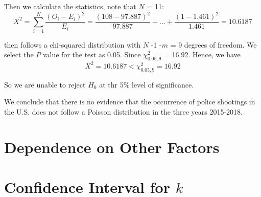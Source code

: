 \documentclass[11pt,a4paper,english]{article}
\begin{document}
Then we calculate the statistics, note that $N$ = 11:
$$
X^{2}=\sum_{i=1}^N{\frac{(O_{i}-E_{i})^{2}}{E_i}}=\frac{(108-97.887)^2}{97.887}+...+\frac{(1-1.461)^2}{1.461}= 10.6187
$$

then follows a chi-squared distribution with $N$ -1 -$m$ = 9 degrees of freedom. We select the $P$ value for the test as 0.05. Since $\chi_{0.05,9}^{2}$ = 16.92. Hence, we have
$$
X^{2}=10.6187 < \chi_{0.05,9}^{2} = 16.92
$$

So we are unable to reject $H_{0}$ at thr 5\% level of significance.

We conclude that there is no evidence that the occurrence of police shootings in the U.S. does not follow a Poisson distribution in the three years 2015-2018.

\section{Dependence on Other Factors}
\section{Confidence Interval for $k$}
\end{document}

